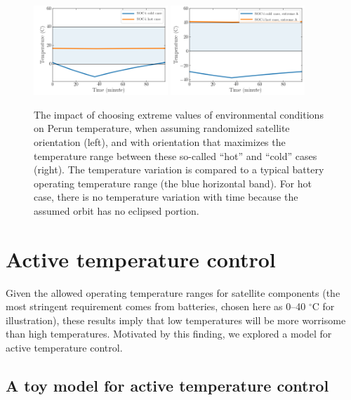 \documentclass[]{aastex62}
\begin{document}
\begin{figure}[t!]
\centering
\includegraphics[width=0.45\textwidth, keepaspectratio]{figures/TempsPlot_SOCi-hotVScold.png} 
\includegraphics[width=0.45\textwidth, keepaspectratio]{figures/TempsPlot_SOCi-hotVScoldExtremeA.png} 

\caption{The impact of choosing extreme values of environmental conditions on Perun temperature,  
when assuming randomized satellite orientation (left), and with orientation that maximizes the temperature 
range between these so-called ``hot'' and ``cold'' cases (right). The temperature variation is compared to 
a typical battery operating temperature range (the blue horizontal band).  For hot case, there is no 
temperature variation with time because the assumed orbit has no eclipsed portion. 
\label{fig:SOCi1}}
\end{figure}


\section{Active temperature control \label{sec:active}} 

Given the allowed operating temperature ranges for satellite components (the most stringent requirement
comes from batteries, chosen here as 0--40 $^\circ$C for illustration), these results imply that 
low temperatures will be more worrisome than high temperatures. Motivated by this finding, we 
explored a model for active temperature control.




\subsection{A toy model for active temperature control } 
\end{document}
